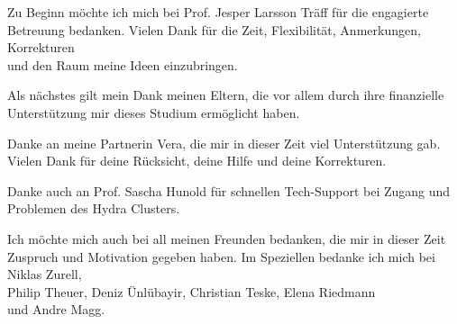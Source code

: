 \documentclass[final,oneside]{vutinfth}
\begin{document}
	
	\frontmatter %
	
	
	\begin{danksagung*}
		\centering
		Zu Beginn möchte ich mich bei Prof. Jesper Larsson Träff für die engagierte Betreuung bedanken. Vielen Dank für die Zeit, Flexibilität, Anmerkungen, Korrekturen\\
		und den Raum meine Ideen einzubringen.
		
		Als nächstes gilt mein Dank meinen Eltern, die vor allem durch ihre finanzielle Unterstützung mir dieses Studium ermöglicht haben.
		
		Danke an meine Partnerin Vera, die mir in dieser Zeit viel Unterstützung gab. Vielen Dank für deine Rücksicht, deine Hilfe und deine Korrekturen.
		
		Danke auch an Prof. Sascha Hunold für schnellen Tech-Support bei Zugang und Problemen des Hydra Clusters.
		
		Ich möchte mich auch bei all meinen Freunden bedanken, die mir in dieser Zeit Zuspruch und Motivation gegeben haben. Im Speziellen bedanke ich mich bei Niklas Zurell, \\Philip Theuer, Deniz Ünlübayir, Christian Teske, Elena Riedmann\\
		und Andre Magg.
	\end{danksagung*}
	
\end{document}
